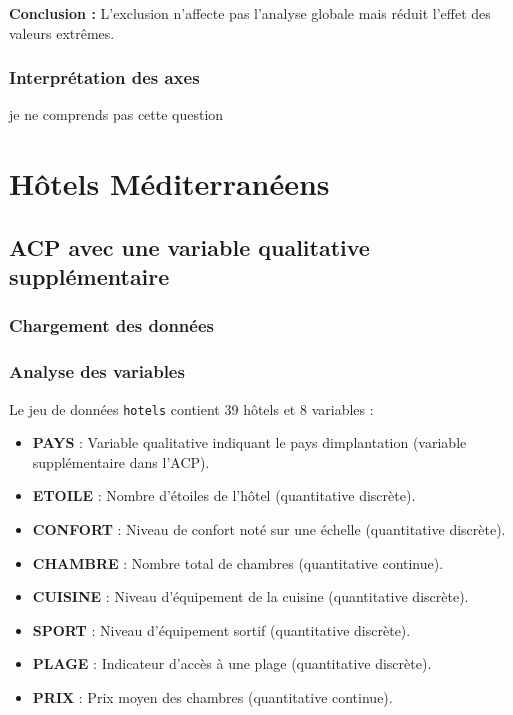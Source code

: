 \documentclass{article}
\begin{document}
    \textbf{Conclusion :} L’exclusion n’affecte pas l’analyse globale mais réduit l’effet des valeurs extrêmes.

    \subsubsection{Interprétation des axes}
    je ne comprends pas cette question


    \section{Hôtels Méditerranéens}

    \subsection{ACP avec une variable qualitative supplémentaire}

    \subsubsection{Chargement des données}

    \subsubsection{Analyse des variables}

    Le jeu de données \texttt{hotels} contient 39 hôtels et 8 variables :

    \begin{itemize}
        \item \textbf{PAYS} : Variable qualitative indiquant le pays dimplantation (variable supplémentaire dans l'ACP).
        \item \textbf{ETOILE} : Nombre d’étoiles de l’hôtel (quantitative discrète).
        \item \textbf{CONFORT} : Niveau de confort noté sur une échelle (quantitative discrète).
        \item \textbf{CHAMBRE} : Nombre total de chambres (quantitative continue).
        \item \textbf{CUISINE} : Niveau d’équipement de la cuisine (quantitative discrète).
        \item \textbf{SPORT} : Niveau d’équipement sortif (quantitative discrète).
        \item \textbf{PLAGE} : Indicateur d’accès à une plage (quantitative discrète).
        \item \textbf{PRIX} : Prix moyen des chambres (quantitative continue).
    \end{itemize}
\end{document}
